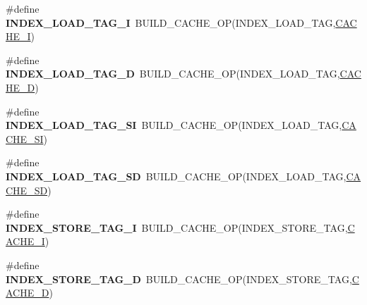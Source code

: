 \begin{DoxyCompactItemize}
\#define {\bfseries I\+N\+D\+E\+X\+\_\+\+L\+O\+A\+D\+\_\+\+T\+A\+G\+\_\+I}~B\+U\+I\+L\+D\+\_\+\+C\+A\+C\+H\+E\+\_\+\+OP(I\+N\+D\+E\+X\+\_\+\+L\+O\+A\+D\+\_\+\+T\+AG,\mbox{\hyperlink{group__mips__regs_gac038c307d75c414069699d4c2741714f}{C\+A\+C\+H\+E\+\_\+I}})
\item 
\mbox{\label{group__mips__regs_gab740dbb3b4550276def991a95ccfe77b}} 
\#define {\bfseries I\+N\+D\+E\+X\+\_\+\+L\+O\+A\+D\+\_\+\+T\+A\+G\+\_\+D}~B\+U\+I\+L\+D\+\_\+\+C\+A\+C\+H\+E\+\_\+\+OP(I\+N\+D\+E\+X\+\_\+\+L\+O\+A\+D\+\_\+\+T\+AG,\mbox{\hyperlink{group__mips__regs_ga0fba561a0aa459e322839f78cc09f839}{C\+A\+C\+H\+E\+\_\+D}})
\item 
\mbox{\label{group__mips__regs_ga017b6e6f61aacdb127c91a1fb1ab5008}} 
\#define {\bfseries I\+N\+D\+E\+X\+\_\+\+L\+O\+A\+D\+\_\+\+T\+A\+G\+\_\+\+SI}~B\+U\+I\+L\+D\+\_\+\+C\+A\+C\+H\+E\+\_\+\+OP(I\+N\+D\+E\+X\+\_\+\+L\+O\+A\+D\+\_\+\+T\+AG,\mbox{\hyperlink{group__mips__regs_gaa127e30b313e010b0c7b53c97503b6ce}{C\+A\+C\+H\+E\+\_\+\+SI}})
\item 
\mbox{\label{group__mips__regs_gad6b4c41a56b8708e5c73e9c0a86471a2}} 
\#define {\bfseries I\+N\+D\+E\+X\+\_\+\+L\+O\+A\+D\+\_\+\+T\+A\+G\+\_\+\+SD}~B\+U\+I\+L\+D\+\_\+\+C\+A\+C\+H\+E\+\_\+\+OP(I\+N\+D\+E\+X\+\_\+\+L\+O\+A\+D\+\_\+\+T\+AG,\mbox{\hyperlink{group__mips__regs_gae713c0e6cb5df3df0030d5d87bb16a6d}{C\+A\+C\+H\+E\+\_\+\+SD}})
\item 
\mbox{\label{group__mips__regs_ga3549af6d802d496ec18654c779a672b4}} 
\#define {\bfseries I\+N\+D\+E\+X\+\_\+\+S\+T\+O\+R\+E\+\_\+\+T\+A\+G\+\_\+I}~B\+U\+I\+L\+D\+\_\+\+C\+A\+C\+H\+E\+\_\+\+OP(I\+N\+D\+E\+X\+\_\+\+S\+T\+O\+R\+E\+\_\+\+T\+AG,\mbox{\hyperlink{group__mips__regs_gac038c307d75c414069699d4c2741714f}{C\+A\+C\+H\+E\+\_\+I}})
\item 
\mbox{\label{group__mips__regs_gab2a6fb81b2f18fd70aff6397611dfdb0}} 
\#define {\bfseries I\+N\+D\+E\+X\+\_\+\+S\+T\+O\+R\+E\+\_\+\+T\+A\+G\+\_\+D}~B\+U\+I\+L\+D\+\_\+\+C\+A\+C\+H\+E\+\_\+\+OP(I\+N\+D\+E\+X\+\_\+\+S\+T\+O\+R\+E\+\_\+\+T\+AG,\mbox{\hyperlink{group__mips__regs_ga0fba561a0aa459e322839f78cc09f839}{C\+A\+C\+H\+E\+\_\+D}})
\item 
\mbox{\label{group__mips__regs_ga6d8485b4f8b13be45e64f214aef96194}} 

\end{DoxyCompactItemize}
